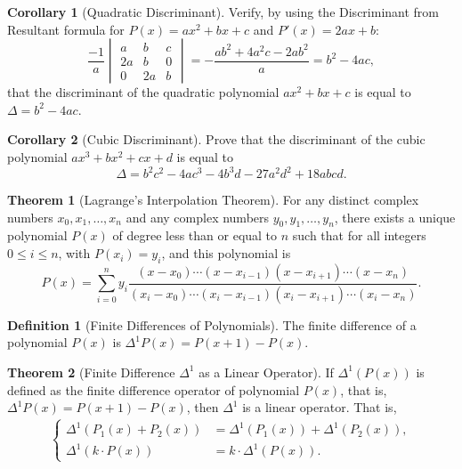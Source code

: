 \documentclass[12pt,a4paper]{memoir}
\theoremstyle{definition}
\newtheorem*{definition}{Definition}
\newtheorem{theorem}{Theorem}
\newtheorem{corollary}{Corollary}
\begin{document}
\begin{corollary}[Quadratic Discriminant]
	Verify, by using the Discriminant from Resultant formula for $P(x)=ax^2+bx+c$ and $P'(x)=2ax+b$:
	\[\frac{-1}{a}\begin{vmatrix}
		a & b & c\\
		2a & b & 0\\
		0 & 2a & b
	\end{vmatrix} = -\frac{ab^2+4a^2c-2ab^2}{a}=b^2-4ac,\]
	that the discriminant of the quadratic polynomial $ax^2+bx+c$ is equal to $\Delta=b^2-4ac$.
\end{corollary}


\begin{corollary}[Cubic Discriminant]
	Prove that the discriminant of the cubic polynomial $ax^3+bx^2+cx+d$ is equal to \[\Delta=b^{2}c^{2}-4ac^{3}-4b^{3}d-27a^{2}d^{2}+18abcd.\]
\end{corollary}


\begin{theorem}[Lagrange's Interpolation Theorem]
	For any distinct complex numbers $x_0, x_1, \dots, x_n$ and any complex numbers $y_0, y_1, \dots, y_n$, there exists a unique polynomial $P(x)$ of degree less than or equal to $n$ such that for all integers $0 \leq i \leq n$, with $P(x_i) = y_i$, and this polynomial is
	\[P(x) = \sum_{i=0}^{n}y_i \frac{(x-x_0) \cdots (x-x_{i-1}) (x-x_{i+1}) \cdots (x-x_n)}{(x_i-x_0) \cdots (x_i-x_{i-1}) (x_i - x_{i+1}) \cdots (x_i - x_n)}.\]
\end{theorem}


\begin{definition}[Finite Differences of Polynomials]
	The finite difference of a polynomial $P(x)$ is $\Delta^1 P(x) = P(x + 1) - P(x)$.
\end{definition}

\begin{theorem}[Finite Difference $\Delta^1$ as a Linear Operator]
	If $\Delta^1(P(x))$ is defined as the finite difference operator of polynomial $P(x)$, that is, $\Delta^1 P(x) = P(x + 1) - P(x)$, then $\Delta^1$ is a linear operator. That is,
	\begin{align*}
		\begin{cases}
			\Delta^1\left(P_1(x)+P_2(x)\right) &= \Delta^1\left(P_1(x)\right)+\Delta^1\left(P_2(x)\right),\\
			\Delta^1\left(k\cdot P(x)\right) &= k\cdot \Delta^1\left(P(x)\right).
		\end{cases}
	\end{align*}
\end{theorem}
\end{document}
